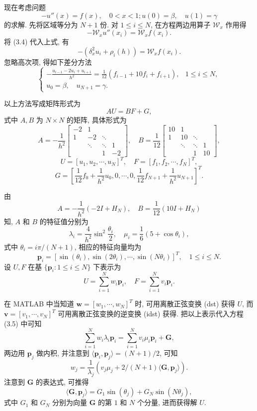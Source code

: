 现在考虑问题
\[ -u''(x) = f(x), \quad 0 < x < 1; u(0) = \beta, \quad u(1) = \gamma \]
的求解. 先将区域等分为 $N+1$ 份. 对 $1 \leq i \leq N$, 在方程两边用算子 $\mathcal{W}_x$ 作用得
\[ -\mathcal{W}_x u''(x_i) = \mathcal{W}_x f(x_i). \]
将 (3.4) 代入上式, 有
\[ -(\delta_x^2 u_i + \rho_i(h)) = \mathcal{W}_x f(x_i). \]
忽略高次项, 得如下差分方法
\begin{equation}
    \begin{cases}
    -\frac{u_{i-1} - 2u_i + u_{i+1}}{h^2} = \frac{1}{12}(f_{i-1} + 10f_i + f_{i+1}), & 1 \leq i \leq N, \\
    u_0 = \beta, \quad u_{N+1} = \gamma.
    \end{cases}
\end{equation}

以上方法写成矩阵形式为
\begin{equation}
    AU = BF + G, 
\end{equation}
式中 $A, B$ 为 $N \times N$ 的矩阵, 具体形式为
\[ A = -\frac{1}{h^2} \begin{bmatrix}
-2 & 1 & & \\
1 & -2 & \ddots & \\
& \ddots & \ddots & 1 \\
& & 1 & -2
\end{bmatrix}, \quad
B = \frac{1}{12} \begin{bmatrix}
10 & 1 & & \\
1 & 10 & \ddots & \\
& \ddots & \ddots & 1 \\
& & 1 & 10
\end{bmatrix}, \]
\[ U = [u_1, u_2, \cdots, u_N]^T, \quad F = [f_1, f_2, \cdots, f_N]^T, \]
\[ G = \left[ \frac{1}{12}f_0 + \frac{1}{h^2}u_0, 0, \cdots, 0, \frac{1}{12}f_{N+1} + \frac{1}{h^2}u_{N+1} \right]^T. \]

由
\[ A = -\frac{1}{h^2}(-2I + H_N), \quad B = \frac{1}{12}(10I + H_N) \]
知, $A$ 和 $B$ 的特征值分别为
\[ \lambda_i = \frac{4}{h^2} \sin^2 \frac{\theta_i}{2}, \quad \mu_i = \frac{1}{6}(5 + \cos \theta_i), \]
式中 $\theta_i = i\pi/(N+1)$, 相应的特征向量均为
\[ \bm{p}_i = [\sin(\theta_i), \sin(2\theta_i), \cdots, \sin(N\theta_i)]^T, \quad 1 \leq i \leq N. \]
设 $U, F$ 在基 $\{\bm{p}_i \colon 1 \leq i \leq N\}$ 下表示为
\[ U = \sum_{i=1}^N w_i \bm{p}_i, \quad F = \sum_{i=1}^N v_i \bm{p}_i. \]

在 MATLAB 中当知道 $\bm{w} = [w_1, \cdots, w_N]^T$ 时, 可用离散正弦变换 (dst) 获得 $U$, 而 $\bm{v} = [v_1, \cdots, v_N]^T$ 可用离散正弦变换的逆变换 (idst) 获得. 把以上表示代入方程 (3.5) 中可知
\[ \sum_{i=1}^N w_i \lambda_i \bm{p}_i = \sum_{i=1}^N v_i \mu_i \bm{p}_i + \bm{G}, \]
两边用 $\bm{p}_j$ 做内积, 并注意到 $\langle \bm{p}_i, \bm{p}_j \rangle = (N+1)/2$, 可知
\[ w_j = \frac{1}{\lambda_j} \left( v_j \mu_j + 2/(N+1) \langle \bm{G}, \bm{p}_j \rangle \right). \]
注意到 $\bm{G}$ 的表达式, 可推得
\begin{equation}
    \langle \bm{G}, \bm{p}_j \rangle = G_1 \sin(\theta_j) + G_N \sin(N\theta_j), 
\end{equation}
式中 $G_1$ 和 $G_N$ 分别为向量 $\bm{G}$ 的第 $1$ 和 $N$ 个分量, 进而获得解 $U$.

